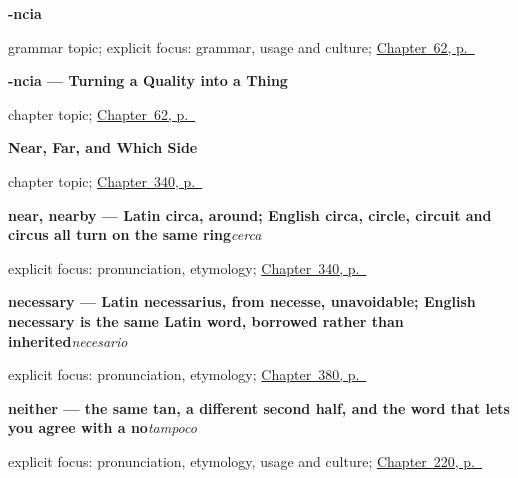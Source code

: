 \noindent\begin{minipage}[t]{\linewidth}
\raggedright
\textbf{-ncia}\par
\footnotesize grammar topic; explicit focus: grammar, usage and culture; \hyperref[ch:ncia]{Chapter~62, p.~\pageref*{ch:ncia}}
\end{minipage}\par\smallskip

\noindent\begin{minipage}[t]{\linewidth}
\raggedright
\textbf{-ncia --- Turning a Quality into a Thing}\par
\footnotesize chapter topic; \hyperref[ch:ncia]{Chapter~62, p.~\pageref*{ch:ncia}}
\end{minipage}\par\smallskip

\noindent\begin{minipage}[t]{\linewidth}
\raggedright
\textbf{Near, Far, and Which Side}\par
\footnotesize chapter topic; \hyperref[ch:cerca-y-lejos]{Chapter~340, p.~\pageref*{ch:cerca-y-lejos}}
\end{minipage}\par\smallskip

\noindent\begin{minipage}[t]{\linewidth}
\raggedright
\textbf{near, nearby — Latin circa, around; English circa, circle, circuit and circus all turn on the same ring}\enspace\emph{cerca}\par
\footnotesize explicit focus: pronunciation, etymology; \hyperref[ch:cerca-y-lejos]{Chapter~340, p.~\pageref*{ch:cerca-y-lejos}}
\end{minipage}\par\smallskip

\noindent\begin{minipage}[t]{\linewidth}
\raggedright
\textbf{necessary — Latin necessarius, from necesse, unavoidable; English necessary is the same Latin word, borrowed rather than inherited}\enspace\emph{necesario}\par
\footnotesize explicit focus: pronunciation, etymology; \hyperref[ch:simpatico-y-alegre]{Chapter~380, p.~\pageref*{ch:simpatico-y-alegre}}
\end{minipage}\par\smallskip

\noindent\begin{minipage}[t]{\linewidth}
\raggedright
\textbf{neither — the same tan, a different second half, and the word that lets you agree with a no}\enspace\emph{tampoco}\par
\footnotesize explicit focus: pronunciation, etymology, usage and culture; \hyperref[ch:tampoco]{Chapter~220, p.~\pageref*{ch:tampoco}}
\end{minipage}\par\smallskip

